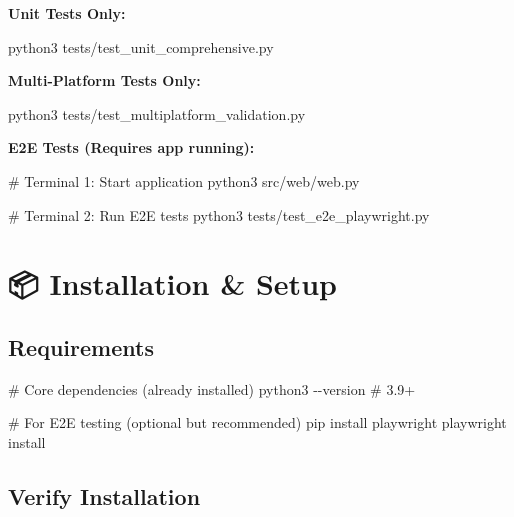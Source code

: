 \documentclass[
  11pt,
  oneside,
  openany]{scrbook}
\newenvironment{Shaded}{\begin{snugshade}}{\end{snugshade}}
\newcommand{\AttributeTok}[1]{\textcolor[rgb]{0.40,0.45,0.13}{#1}}
\newcommand{\CommentTok}[1]{\textcolor[rgb]{0.37,0.37,0.37}{#1}}
\newcommand{\ExtensionTok}[1]{\textcolor[rgb]{0.00,0.23,0.31}{#1}}
\newcommand{\NormalTok}[1]{\textcolor[rgb]{0.00,0.23,0.31}{#1}}
\begin{document}
\textbf{Unit Tests Only:}

\begin{Shaded}
\begin{Highlighting}[]
\ExtensionTok{python3}\NormalTok{ tests/test\_unit\_comprehensive.py}
\end{Highlighting}
\end{Shaded}

\textbf{Multi-Platform Tests Only:}

\begin{Shaded}
\begin{Highlighting}[]
\ExtensionTok{python3}\NormalTok{ tests/test\_multiplatform\_validation.py}
\end{Highlighting}
\end{Shaded}

\textbf{E2E Tests (Requires app running):}

\begin{Shaded}
\begin{Highlighting}[]
\CommentTok{\# Terminal 1: Start application}
\ExtensionTok{python3}\NormalTok{ src/web/web.py}

\CommentTok{\# Terminal 2: Run E2E tests}
\ExtensionTok{python3}\NormalTok{ tests/test\_e2e\_playwright.py}
\end{Highlighting}
\end{Shaded}

\section{📦 Installation \& Setup}\label{installation-setup}

\subsection{Requirements}\label{requirements}

\begin{Shaded}
\begin{Highlighting}[]
\CommentTok{\# Core dependencies (already installed)}
\ExtensionTok{python3} \AttributeTok{{-}{-}version}  \CommentTok{\# 3.9+}

\CommentTok{\# For E2E testing (optional but recommended)}
\ExtensionTok{pip}\NormalTok{ install playwright}
\ExtensionTok{playwright}\NormalTok{ install}
\end{Highlighting}
\end{Shaded}

\subsection{Verify Installation}\label{verify-installation}
\end{document}
